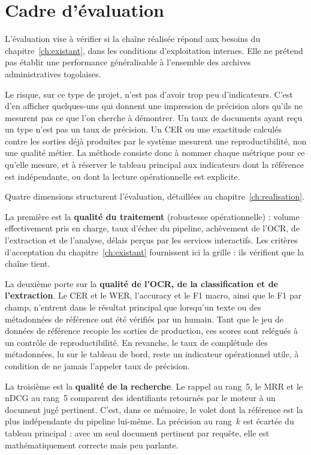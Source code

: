 \section{Cadre d'évaluation}

L'évaluation vise à vérifier si la chaîne réalisée répond aux besoins du chapitre~\ref{ch:existant}, dans les conditions d'exploitation internes. Elle ne prétend pas établir une performance généralisable à l'ensemble des archives administratives togolaises.

Le risque, sur ce type de projet, n'est pas d'avoir trop peu d'indicateurs. C'est d'en afficher quelques-uns qui donnent une impression de précision alors qu'ils ne mesurent pas ce que l'on cherche à démontrer. Un taux de documents ayant reçu un type n'est pas un taux de précision. Un CER ou une exactitude calculés contre les sorties déjà produites par le système mesurent une reproductibilité, non une qualité métier. La méthode consiste donc à nommer chaque métrique pour ce qu'elle mesure, et à réserver le tableau principal aux indicateurs dont la référence est indépendante, ou dont la lecture opérationnelle est explicite.

Quatre dimensions structurent l'évaluation, détaillées au chapitre~\ref{ch:realisation}.

La première est la \textbf{qualité du traitement} (robustesse opérationnelle) : volume effectivement pris en charge, taux d'échec du pipeline, achèvement de l'OCR, de l'extraction et de l'analyse, délais perçus par les services interactifs. Les critères d'acceptation du chapitre~\ref{ch:existant} fournissent ici la grille : ils vérifient que la chaîne tient.

La deuxième porte sur la \textbf{qualité de l'OCR, de la classification et de l'extraction}. Le CER et le WER, l'accuracy et le F1 macro, ainsi que le F1 par champ, n'entrent dans le résultat principal que lorsqu'un texte ou des métadonnées de référence ont été vérifiés par un humain. Tant que le jeu de données de référence recopie les sorties de production, ces scores sont relégués à un contrôle de reproductibilité. En revanche, le taux de complétude des métadonnées, lu sur le tableau de bord, reste un indicateur opérationnel utile, à condition de ne jamais l'appeler taux de précision.

La troisième est la \textbf{qualité de la recherche}. Le rappel au rang~5, le MRR et le nDCG au rang~5 comparent des identifiants retournés par le moteur à un document jugé pertinent. C'est, dans ce mémoire, le volet dont la référence est la plus indépendante du pipeline lui-même. La précision au rang~$k$ est écartée du tableau principal : avec un seul document pertinent par requête, elle est mathématiquement correcte mais peu parlante.

